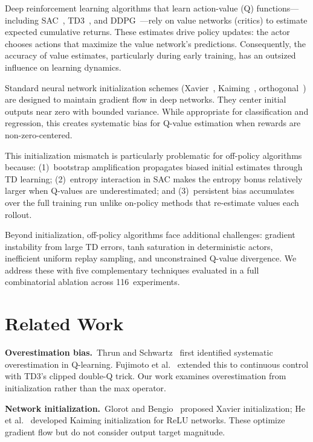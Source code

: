 \documentclass[11pt,a4paper]{article}
\begin{document}
Deep reinforcement learning algorithms that learn action-value (Q) functions---including SAC~\citep{haarnoja2018sac}, TD3~\citep{fujimoto2018td3}, and DDPG~\citep{lillicrap2016ddpg}---rely on value networks (critics) to estimate expected cumulative returns. These estimates drive policy updates: the actor chooses actions that maximize the value network's predictions. Consequently, the accuracy of value estimates, particularly during early training, has an outsized influence on learning dynamics.

Standard neural network initialization schemes (Xavier~\citep{glorot2010xavier}, Kaiming~\citep{he2015kaiming}, orthogonal~\citep{saxe2014orthogonal}) are designed to maintain gradient flow in deep networks. They center initial outputs near zero with bounded variance. While appropriate for classification and regression, this creates systematic bias for Q-value estimation when rewards are non-zero-centered.

This initialization mismatch is particularly problematic for off-policy algorithms because: (1)~bootstrap amplification propagates biased initial estimates through TD learning; (2)~entropy interaction in SAC makes the entropy bonus relatively larger when Q-values are underestimated; and (3)~persistent bias accumulates over the full training run unlike on-policy methods that re-estimate values each rollout.

Beyond initialization, off-policy algorithms face additional challenges: gradient instability from large TD errors, tanh saturation in deterministic actors, inefficient uniform replay sampling, and unconstrained Q-value divergence. We address these with five complementary techniques evaluated in a full combinatorial ablation across 116~experiments.

\section{Related Work}

\textbf{Overestimation bias.}~Thrun and Schwartz~\citep{thrun1993overestimation} first identified systematic overestimation in Q-learning. Fujimoto et al.~\citep{fujimoto2018td3} extended this to continuous control with TD3's clipped double-Q trick. Our work examines overestimation from initialization rather than the max operator.

\textbf{Network initialization.}~Glorot and Bengio~\citep{glorot2010xavier} proposed Xavier initialization; He et al.~\citep{he2015kaiming} developed Kaiming initialization for ReLU networks. These optimize gradient flow but do not consider output target magnitude.
\end{document}
